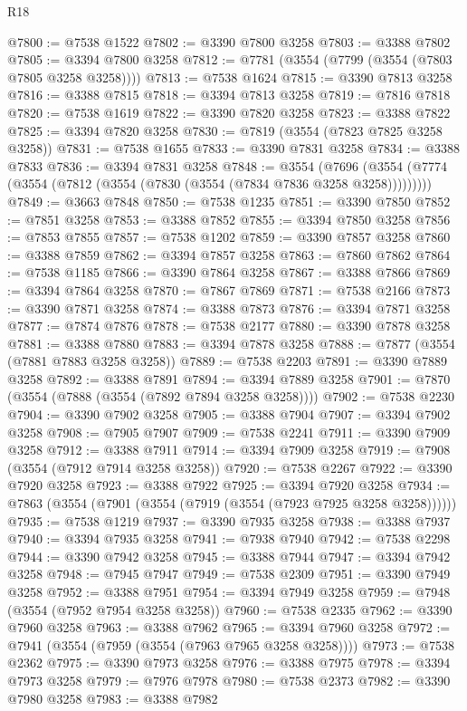\begin{lexlean}{R18}
\begin{coremodule}
@7800 := @7538 @1522
@7802 := @3390 @7800 @3258
@7803 := @3388 @7802
@7805 := @3394 @7800 @3258
@7812 := @7781 (@3554 (@7799 (@3554 (@7803 @7805 @3258 @3258))))
@7813 := @7538 @1624
@7815 := @3390 @7813 @3258
@7816 := @3388 @7815
@7818 := @3394 @7813 @3258
@7819 := @7816 @7818
@7820 := @7538 @1619
@7822 := @3390 @7820 @3258
@7823 := @3388 @7822
@7825 := @3394 @7820 @3258
@7830 := @7819 (@3554 (@7823 @7825 @3258 @3258))
@7831 := @7538 @1655
@7833 := @3390 @7831 @3258
@7834 := @3388 @7833
@7836 := @3394 @7831 @3258
@7848 := @3554
    (@7696 (@3554 (@7774 (@3554 (@7812 (@3554 (@7830 (@3554 (@7834 @7836 @3258 @3258)))))))))
@7849 := @3663 @7848
@7850 := @7538 @1235
@7851 := @3390 @7850
@7852 := @7851 @3258
@7853 := @3388 @7852
@7855 := @3394 @7850 @3258
@7856 := @7853 @7855
@7857 := @7538 @1202
@7859 := @3390 @7857 @3258
@7860 := @3388 @7859
@7862 := @3394 @7857 @3258
@7863 := @7860 @7862
@7864 := @7538 @1185
@7866 := @3390 @7864 @3258
@7867 := @3388 @7866
@7869 := @3394 @7864 @3258
@7870 := @7867 @7869
@7871 := @7538 @2166
@7873 := @3390 @7871 @3258
@7874 := @3388 @7873
@7876 := @3394 @7871 @3258
@7877 := @7874 @7876
@7878 := @7538 @2177
@7880 := @3390 @7878 @3258
@7881 := @3388 @7880
@7883 := @3394 @7878 @3258
@7888 := @7877 (@3554 (@7881 @7883 @3258 @3258))
@7889 := @7538 @2203
@7891 := @3390 @7889 @3258
@7892 := @3388 @7891
@7894 := @3394 @7889 @3258
@7901 := @7870 (@3554 (@7888 (@3554 (@7892 @7894 @3258 @3258))))
@7902 := @7538 @2230
@7904 := @3390 @7902 @3258
@7905 := @3388 @7904
@7907 := @3394 @7902 @3258
@7908 := @7905 @7907
@7909 := @7538 @2241
@7911 := @3390 @7909 @3258
@7912 := @3388 @7911
@7914 := @3394 @7909 @3258
@7919 := @7908 (@3554 (@7912 @7914 @3258 @3258))
@7920 := @7538 @2267
@7922 := @3390 @7920 @3258
@7923 := @3388 @7922
@7925 := @3394 @7920 @3258
@7934 := @7863 (@3554 (@7901 (@3554 (@7919 (@3554 (@7923 @7925 @3258 @3258))))))
@7935 := @7538 @1219
@7937 := @3390 @7935 @3258
@7938 := @3388 @7937
@7940 := @3394 @7935 @3258
@7941 := @7938 @7940
@7942 := @7538 @2298
@7944 := @3390 @7942 @3258
@7945 := @3388 @7944
@7947 := @3394 @7942 @3258
@7948 := @7945 @7947
@7949 := @7538 @2309
@7951 := @3390 @7949 @3258
@7952 := @3388 @7951
@7954 := @3394 @7949 @3258
@7959 := @7948 (@3554 (@7952 @7954 @3258 @3258))
@7960 := @7538 @2335
@7962 := @3390 @7960 @3258
@7963 := @3388 @7962
@7965 := @3394 @7960 @3258
@7972 := @7941 (@3554 (@7959 (@3554 (@7963 @7965 @3258 @3258))))
@7973 := @7538 @2362
@7975 := @3390 @7973 @3258
@7976 := @3388 @7975
@7978 := @3394 @7973 @3258
@7979 := @7976 @7978
@7980 := @7538 @2373
@7982 := @3390 @7980 @3258
@7983 := @3388 @7982

\end{coremodule}
\end{lexlean}
